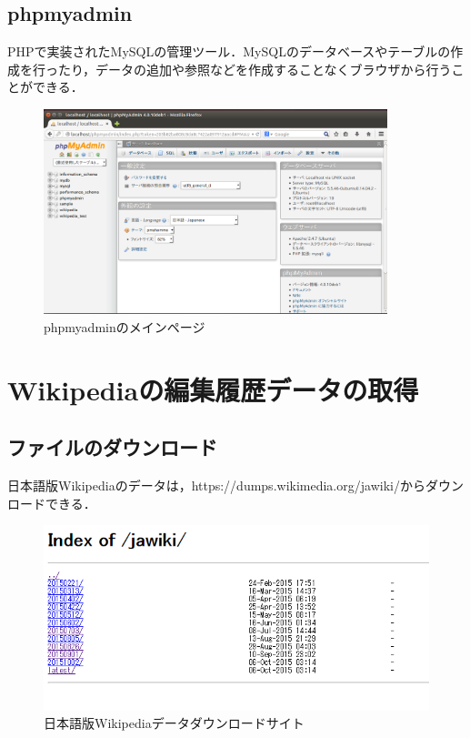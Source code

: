\subsection{phpmyadmin}

PHPで実装されたMySQLの管理ツール．MySQLのデータベースやテーブルの作成を行ったり，データの追加や参照などを作成することなくブラウザから行うことができる．

\begin{figure}[H]
\centering
\includegraphics[width=10cm]{phpmyadmin_main.png}
\caption{phpmyadminのメインページ}\label{サンプル図}
\end{figure}

\clearpage


\section{Wikipediaの編集履歴データの取得}

\subsection{ファイルのダウンロード}

日本語版Wikipediaのデータは，https://dumps.wikimedia.org/jawiki/からダウンロードできる．

\begin{figure}[H]
\centering
\includegraphics[width=14cm]{Index_of_jawiki.PNG}
\caption{日本語版Wikipediaデータダウンロードサイト}\label{サンプル図}
\end{figure}

